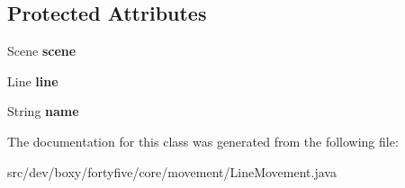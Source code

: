 \subsection*{Protected Attributes}
\begin{DoxyCompactItemize}
\item 
\hypertarget{classdev_1_1boxy_1_1fortyfive_1_1core_1_1movement_1_1_line_movement_a73d9954dbc47dd5cb9ed1db917a900cc}{
Scene {\bfseries scene}}
\label{d8/d51/classdev_1_1boxy_1_1fortyfive_1_1core_1_1movement_1_1_line_movement_a73d9954dbc47dd5cb9ed1db917a900cc}

\item 
\hypertarget{classdev_1_1boxy_1_1fortyfive_1_1core_1_1movement_1_1_line_movement_a894d1874d05e994fc2f33b8aae6240e0}{
Line {\bfseries line}}
\label{d8/d51/classdev_1_1boxy_1_1fortyfive_1_1core_1_1movement_1_1_line_movement_a894d1874d05e994fc2f33b8aae6240e0}

\item 
\hypertarget{classdev_1_1boxy_1_1fortyfive_1_1core_1_1movement_1_1_line_movement_a1ed785f45f2bb42a38f02645f1f9cbdd}{
String {\bfseries name}}
\label{d8/d51/classdev_1_1boxy_1_1fortyfive_1_1core_1_1movement_1_1_line_movement_a1ed785f45f2bb42a38f02645f1f9cbdd}

\end{DoxyCompactItemize}


The documentation for this class was generated from the following file:\begin{DoxyCompactItemize}
\item 
src/dev/boxy/fortyfive/core/movement/LineMovement.java\end{DoxyCompactItemize}
